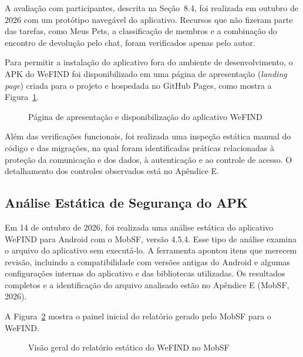 A avaliação com participantes, descrita na Seção~8.4, foi realizada em outubro de 2026 com um protótipo navegável do aplicativo. Recursos que não fizeram parte das tarefas, como Meus Pets, a classificação de membros e a combinação do encontro de devolução pelo chat, foram verificados apenas pelo autor.

Para permitir a instalação do aplicativo fora do ambiente de desenvolvimento, o APK do WeFIND foi disponibilizado em uma página de apresentação (\textit{landing page}) criada para o projeto e hospedada no GitHub Pages, como mostra a Figura~\ref{fig:landing_page_wefind}.

\begin{figure}[H]
    \centering
    \caption{Página de apresentação e disponibilização do aplicativo WeFIND}
    \label{fig:landing_page_wefind}
\end{figure}

Além das verificações funcionais, foi realizada uma inspeção estática manual do código e das migrações, na qual foram identificadas práticas relacionadas à proteção da comunicação e dos dados, à autenticação e ao controle de acesso. O detalhamento dos controles observados está no Apêndice E.

\subsection{Análise Estática de Segurança do APK}

Em 14 de outubro de 2026, foi realizada uma análise estática do aplicativo WeFIND para Android com o MobSF, versão 4.5.4. Esse tipo de análise examina o arquivo do aplicativo sem executá-lo. A ferramenta apontou itens que merecem revisão, incluindo a compatibilidade com versões antigas do Android e algumas configurações internas do aplicativo e das bibliotecas utilizadas. Os resultados completos e a identificação do arquivo analisado estão no Apêndice E (MobSF, 2026).

A Figura~\ref{fig:mobsf_visao_geral} mostra o painel inicial do relatório gerado pelo MobSF para o WeFIND.

\begin{figure}[H]
    \centering
    \caption{Visão geral do relatório estático do WeFIND no MobSF}
    \label{fig:mobsf_visao_geral}
\end{figure}

